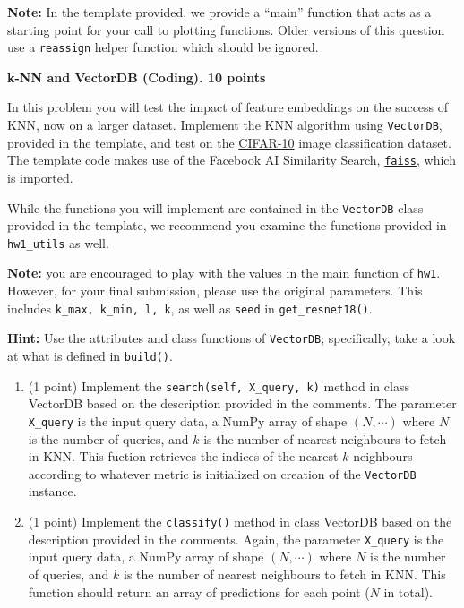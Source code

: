 \documentclass{article}
\begin{document}
\begin{enumerate}
\begin{Q}
\begin{enumerate}
      \textbf{Note:} In the template provided, we provide a ``main'' function that 
      acts as a starting point for your call to plotting functions. Older versions of this 
      question use a \texttt{reassign} helper function which should be ignored. 
    
  \end{enumerate}
\end{Q}

\begin{Q}
   \textbf{k-NN and VectorDB  (Coding). 10 points}

  In this problem you will test the impact of feature embeddings on the success of KNN, now on a larger dataset. 
  Implement the KNN algorithm using \texttt{VectorDB}, provided in the template, and test on the \href{https://www.cs.toronto.edu/~kriz/cifar.html}{CIFAR-10} image classification dataset. 
  The template code makes use of the Facebook AI Similarity Search, \href{https://github.com/facebookresearch/faiss}{\texttt{faiss}}, which is imported. 

  While the functions you will implement are contained in the \texttt{VectorDB} class provided in the template, we recommend you examine the functions provided in \texttt{hw1\_utils} as well. 

  \textbf{Note:} you are encouraged to play with the values in the main function of \texttt{hw1}. However, for your final submission, please use the original parameters. This includes \texttt{k\_max, k\_min, l, k}, as well as \texttt{seed} in \texttt{get\_resnet18()}.

  \textbf{Hint:} Use the attributes and class functions of \texttt{VectorDB}; specifically, take a look at what is defined in \texttt{build()}.

  \begin{enumerate}
  \item (1 point) Implement the \texttt{search(self, X\_query, k)} method in class VectorDB based on the description provided in the comments. 
  The parameter \texttt{X\_query} is the input query data, a NumPy array of shape $(N, \cdots)$ where $N$ is the number of queries, and $k$ is the number of nearest neighbours to fetch in KNN.
  This fuction retrieves the indices of the nearest $k$ neighbours according to whatever metric is initialized on creation of the \texttt{VectorDB} instance. 

  \item (1 point) Implement the \texttt{classify()} method in class VectorDB based on the
    description provided in the comments. Again, the parameter \texttt{X\_query} is the input query data, a NumPy array of shape $(N, \cdots)$ where $N$ is the number of queries, and $k$ is the number of nearest neighbours to fetch in KNN.
    This function should return an array of predictions for each point ($N$ in total).


\end{enumerate}
\end{Q}
\end{enumerate}
\end{document}
